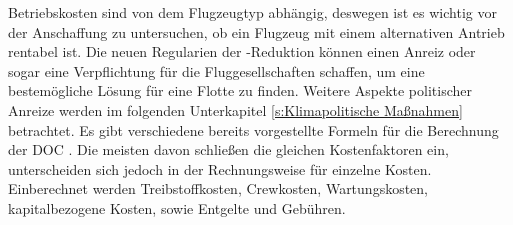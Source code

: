 Betriebskosten sind von dem Flugzeugtyp abhängig, deswegen ist es wichtig vor der Anschaffung zu untersuchen, 
ob ein Flugzeug mit einem alternativen Antrieb rentabel ist. 
Die neuen Regularien der -Reduktion können einen Anreiz oder sogar 
eine Verpflichtung für die Fluggesellschaften schaffen, um eine bestemögliche Lösung für eine Flotte zu finden. 
Weitere Aspekte politischer Anreize werden im folgenden Unterkapitel \ref{s:Klimapolitische Maßnahmen} betrachtet.
%
Es gibt verschiedene bereits vorgestellte Formeln für die Berechnung der DOC \cite{scholz_design_evaluation_doc}. 
Die meisten davon schließen die gleichen Kostenfaktoren ein, 
unterscheiden sich jedoch in der Rechnungsweise für einzelne Kosten.\\ 
Einberechnet werden Treibstoffkosten, Crewkosten, Wartungskosten, kapitalbezogene Kosten, sowie Entgelte und Gebühren.

